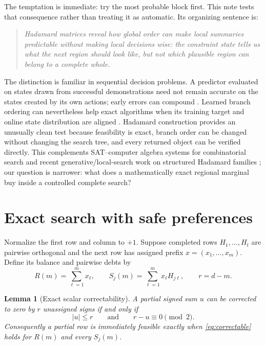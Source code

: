 \documentclass[10pt,twoside]{article}
\theoremstyle{noteplain}
\newtheorem{lemma}[theorem]{Lemma}
\theoremstyle{definition}
\begin{document}
The temptation is immediate: try the most probable block first.  This note tests that consequence rather than treating it as automatic.  Its organizing sentence is:
\begin{quote}
\centering\itshape
Hadamard matrices reveal how global order can make local summaries predictable without making local decisions wise: the constraint state tells us what the next region should look like, but not which plausible region can belong to a complete whole.
\end{quote}

The distinction is familiar in sequential decision problems.  A predictor evaluated on states drawn from successful demonstrations need not remain accurate on the states created by its own actions; early errors can compound \citep{ross2011}.  Learned branch ordering can nevertheless help exact algorithms when its training target and online state distribution are aligned \citep{he2014}.  Hadamard construction provides an unusually clean test because feasibility is exact, branch order can be changed without changing the search tree, and every returned object can be verified directly.  This complements SAT--computer algebra systems for combinatorial search \citep{bright2019} and recent generative/local-search work on structured Hadamard families \citep{williamson2026}; our question is narrower: what does a mathematically exact regional marginal buy inside a controlled complete search?

\section{Exact search with safe preferences}

Normalize the first row and column to $+1$.  Suppose completed rows $H_1,\ldots,H_t$ are pairwise orthogonal and the next row has assigned prefix $x=(x_1,\ldots,x_m)$.  Define its balance and pairwise debts by
\begin{equation}\label{eq:state}
R(m)=\sum_{\ell=1}^{m}x_\ell,
\qquad
S_j(m)=\sum_{\ell=1}^{m}x_\ell H_{j\ell},
\qquad
r=d-m.
\end{equation}

\begin{lemma}[Exact scalar correctability]\label{lem:correctable}
A partial signed sum $u$ can be corrected to zero by $r$ unassigned signs if and only if
\begin{equation}\label{eq:correctable}
|u|\le r
\qquad\text{and}\qquad
r-u\equiv0\pmod 2.
\end{equation}
Consequently a partial row is immediately feasible exactly when \eqref{eq:correctable} holds for $R(m)$ and every $S_j(m)$.
\end{lemma}
\end{document}
